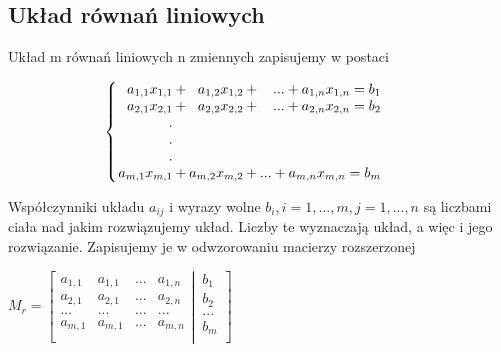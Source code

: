 \documentclass{article}
\begin{document}
\subsection{Układ równań liniowych}\label{Układ równań liniowych}
Układ m równań liniowych n zmiennych zapisujemy w postaci 
\begin{center}
    \[
\setlength\arraycolsep{1pt}
\left\{
\begin{array}{rcrcrc@{\qquad}l}
a_{1,1}x_{1,1} &+&   a_{1,2}x_{1,2} & + & ... + a_{1,n}x_{1,n} = b_{1}\\
a_{2,1}x_{2,1} &+&   a_{2,2}x_{2,2} & + & ... + a_{2,n}x_{2,n} = b_{2}\\
 . &  &      &   &       &      &   \\
 . &  &      &   &       &      &   \\
 . &  &      &   &       &      &   \\
a_{m,1}x_{m,1} &+&   a_{m,2}x_{m,2} & + & ... + a_{m,n}x_{m,n} = b_{m}
\end{array}
\right.
\]
\end{center}
Współczynniki układu \begin{math}a_{ij}\end{math} i wyrazy wolne \begin{math}b_{i}, i = 1,...,m, j = 1,...,n\end{math} są liczbami ciała nad jakim rozwiązujemy układ. Liczby te wyznaczają układ, a więc i jego rozwiązanie. Zapisujemy je w odwzorowaniu macierzy rozszerzonej
\begin{center}
    \begin{math}
    M_{r}=
\left[
  \begin{matrix}
    a_{1,1} & a_{1,1} & ... & a_{1,n} \\
    a_{2,1} & a_{2,1} & ... & a_{2,n} \\
    ... & ... & ... & ... \\
    a_{m,1} & a_{m,1} & ... & a_{m,n} \\
  \end{matrix}
  \left|
    \,
    \begin{matrix}
      b_{1}  \\
      b_{2}  \\
      ...  \\
      b_{m}  \\
    \end{matrix}
  \right.
\right]
\end{math}
\end{center}
\end{document}

